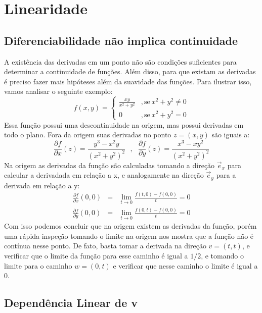 \section{Linearidade}


\subsection{Diferenciabilidade não implica continuidade}

A existência das derivadas em um ponto não são condições suficientes para determinar a continuidade de funções. Além disso, para que existam as derivadas é preciso fazer mais hipóteses além da suavidade das funções. Para ilustrar isso, vamos analisar o seguinte exemplo:
%
%
\[
f(x,y) = \begin{cases} 
	\frac{xy}{x^2 + y^2} &, \text{se} \ x^2 + y^2 \neq 0 \\ 
	0                    &, \text{se} \  x^2 + y^2 = 0 
\end{cases}
\]
%
%
Essa função possui uma descontinuidade na origem, mas possui derivadas em todo o plano. Fora da origem suas derivadas no ponto $z = (x,y)$ são iguais a:
%
%
%
\[
\frac{\partial f}{\partial x}(z) = \frac{y^3-x^2y}{(x^2 + y^2)^2}   
\ \ \ , \ \ \
\frac{\partial f}{\partial y}(z) = \frac{x^3-xy^2}{(x^2 + y^2)^2}
\]
%
%
Na origem as derivadas da função são calculadas tomando a direção $\vec{e}_x$ para calcular a derivadada em relação a x, e analogamente na direção $\vec{e}_y$ para a derivada em relação a y:
%
%
%
\begin{eqnarray*}
\frac{\partial f}{\partial x}(0,0) &=& \lim_{t\to 0}\frac{f(t,0) - f(0,0)}{t} = 0\\
\frac{\partial f}{\partial y}(0,0) &=& \lim_{t\to 0}\frac{f(0,t) - f(0,0)}{t} = 0
\end{eqnarray*}
%
%
Com isso podemos concluir que na origem existem as derivadas da função, porém uma rápida inspeção tomando o limite na origem nos mostra que a função não é contínua nesse ponto. De fato, basta tomar a derivada na direção $v = (t,t)$, e verificar que o limite da função para esse caminho é igual a $1/2$, e tomando o limite para o caminho $w = (0,t)$ e verificar que nesse caminho o limite é igual a 0.



\subsection{Dependência Linear de v} 

